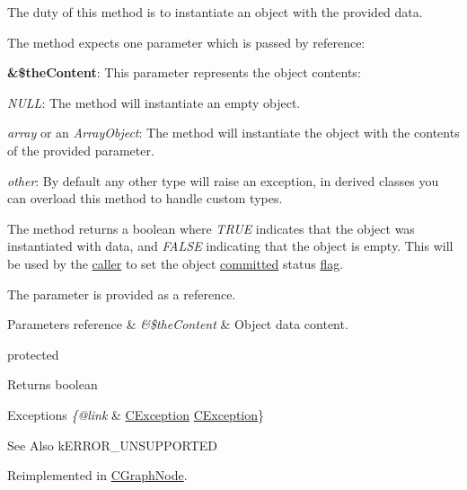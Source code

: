 The duty of this method is to instantiate an object with the provided data.

The method expects one parameter which is passed by reference\-:


\begin{DoxyItemize}
\item {\bfseries \&\$the\-Content}\-: This parameter represents the object contents\-: 
\begin{DoxyItemize}
\item {\itshape N\-U\-L\-L}\-: The method will instantiate an empty object. 
\item {\itshape array} or an {\itshape Array\-Object}\-: The method will instantiate the object with the contents of the provided parameter. 
\item {\itshape other}\-: By default any other type will raise an exception, in derived classes you can overload this method to handle custom types. 
\end{DoxyItemize}
\end{DoxyItemize}

The method returns a boolean where {\itshape T\-R\-U\-E} indicates that the object was instantiated with data, and {\itshape F\-A\-L\-S\-E} indicating that the object is empty. This will be used by the \hyperlink{class_c_persistent_object_a0f0729cfaef48bd1c98c0711c061a7d3}{caller} to set the object \hyperlink{class_c_persistent_object_a6520a7bcecf3f39fd61ec6d08f736e77}{committed} status \hyperlink{}{flag}.

The parameter is provided as a reference.


\begin{DoxyParams}[1]{Parameters}
reference & {\em \&\$the\-Content} & Object data content.\\
\hline
\end{DoxyParams}
protected \begin{DoxyReturn}{Returns}
boolean
\end{DoxyReturn}

\begin{DoxyExceptions}{Exceptions}
{\em \{@link} & \hyperlink{class_c_exception}{C\-Exception} \hyperlink{class_c_exception}{C\-Exception}\}\\
\hline
\end{DoxyExceptions}
\begin{DoxySeeAlso}{See Also}
k\-E\-R\-R\-O\-R\-\_\-\-U\-N\-S\-U\-P\-P\-O\-R\-T\-E\-D 
\end{DoxySeeAlso}


Reimplemented in \hyperlink{class_c_graph_node_a90e49bf5e95ccf3c8644196696154268}{C\-Graph\-Node}.

